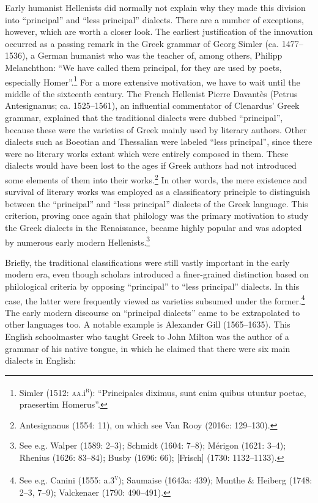 \begin{styleStandard}
\end{styleStandard}

\begin{styleStandard}
Early humanist Hellenists did normally not explain why they made this division into “principal” and “less principal” dialects. There are a number of exceptions, however, which are worth a closer look. The earliest justification of the innovation occurred as a passing remark in the Greek grammar of Georg Simler (ca. 1477–1536), a German humanist who was the teacher of, among others, Philipp Melanchthon: “We have called them principal, for they are used by poets, especially Homer”.\footnote{ Simler (1512: \textsc{aa.}i\textsc{\textsuperscript{r}}): “Principales diximus, sunt enim quibus utuntur poetae, praesertim Homerus”.} For a more extensive motivation, we have to wait until the middle of the sixteenth century. The French Hellenist Pierre Davantès (Petrus Antesignanus; ca. 1525–1561), an influential commentator of Clenardus’ Greek grammar, explained that the traditional dialects were dubbed “principal”, because these were the varieties of Greek mainly used by literary authors. Other dialects such as Boeotian and Thessalian were labeled “less principal”, since there were no literary works extant which were entirely composed in them. These dialects would have been lost to the ages if Greek authors had not introduced some elements of them into their works.\footnote{ Antesignanus (1554: 11), on which see Van Rooy (2016c: 129–130).} In other words, the mere existence and survival of literary works was employed as a classificatory principle to distinguish between the “principal” and “less principal” dialects of the Greek language. This criterion, proving once again that philology was the primary motivation to study the Greek dialects in the Renaissance, became highly popular and was adopted by numerous early modern Hellenists.\footnote{ See e.g. Walper (1589: 2–3); Schmidt (1604: 7–8); Mérigon (1621: 3–4); Rhenius (1626: 83–84); Busby (1696: 66); [Frisch] (1730: 1132–1133).}
\end{styleStandard}

\begin{styleStandard}
Briefly, the traditional classifications were still vastly important in the early modern era, even though scholars introduced a finer-grained distinction based on philological criteria by opposing “principal” to “less principal” dialects. In this case, the latter were frequently viewed as varieties subsumed under the former.\footnote{ See e.g. Canini (1555: a.3\textsc{\textsuperscript{v}}); Saumaise (1643a: 439); Munthe \& Heiberg (1748: 2–3, 7–9); Valckenaer (1790: 490–491).} The early modern discourse on “principal dialects” came to be extrapolated to other languages too. A notable example is Alexander Gill (1565–1635). This English schoolmaster who taught Greek to John Milton was the author of a grammar of his native tongue, in which he claimed that there were six main dialects in English:
\end{styleStandard}

